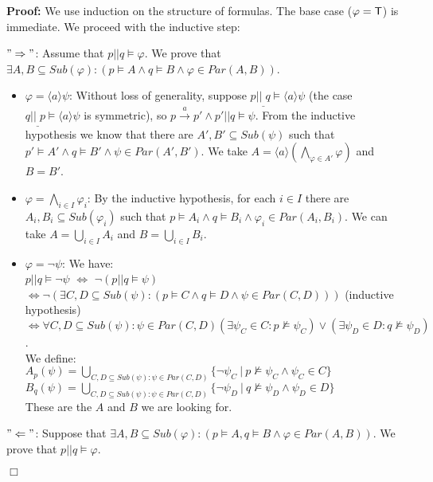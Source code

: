 \documentclass{eptcs}
\def\transa{\stackrel{a}{\rightarrow}}
\def\transa{\stackrel{a}{\rightarrow}}
\def\iff{\Leftrightarrow}
\def\implies{\Rightarrow}
\def\true{{\sf T}}
\newenvironment{proof}{\begin{trivlist} \item[\hspace{\labelsep}\bf Proof:]}{\hfill $\Box$ \end{trivlist}}
\newcommand{\diam}[1]{\langle#1\rangle}
\newcommand{\lmerge}[2]{#1 ||_{\_} #2}
\begin{document}
\begin{proof} 
 We use induction on the structure of formulas. The base case ($\varphi = \true$) is immediate. We proceed with the inductive step:
 
$"\implies"$: Assume that $p || q \models \varphi$. We prove that $\exists A,B \subseteq Sub(\varphi): (p \models A \wedge q \models B \wedge \varphi \in Par(A,B))$.

\begin{itemize}
\item $\varphi = \diam{a} \psi$: Without loss of generality, suppose $\lmerge{p}{q} \models \diam{a} \psi$ (the case $\lmerge{q}{p} \models \diam{a} \psi$ is symmetric), so $p \transa p' \wedge p' || q \models \psi$. From the inductive hypothesis we know that there are $A',B' \subseteq Sub(\psi)$ such that $p' \models A' \wedge q \models B' \wedge \psi \in Par(A',B')$. We take $A = \diam{a}(\bigwedge_{\varphi\in A'}\varphi)$ and $B =B'$.

\item $\varphi = \bigwedge_{i\in I} \varphi_i$: By the inductive hypothesis, for each $i\in I$ there are $A_i,B_i\subseteq Sub(\varphi_i)$ such that $p\models A_i \wedge q\models B_i \wedge \varphi_i\in Par(A_i,B_i)$. We can take $A = \bigcup_{i \in I} A_i$ and $B = \bigcup_{i \in I} B_i$.

\item $\varphi = \neg \psi$: We have:\\
$p ||q \models \neg \psi $ $\iff$ $ \neg (p ||q \models \psi)$\\
$\iff \neg (\exists C,D \subseteq Sub(\psi): (p \models C \wedge q \models D \wedge \psi \in Par(C,D)))$ (inductive hypothesis)\\
$\iff \forall C,D \subseteq Sub(\psi): \psi \in Par(C,D) 
(\exists \psi_C \in C: p \not \models \psi_C) \vee (\exists \psi_D \in D: q \not \models \psi_D)$.\\
We define:\\
$ A_p(\psi) = \bigcup_{C,D \subseteq Sub(\psi): \psi \in Par(C,D) } \{ \neg \psi_C ~|~ p \not \models \psi_C \wedge \psi_C \in C \} $\\
$ B_q(\psi) = \bigcup_{C,D \subseteq Sub(\psi): \psi \in Par(C,D) } \{ \neg \psi_D ~|~ q \not \models \psi_D \wedge \psi_D \in D \} $\\
These are the $A$ and $B$ we are looking for.
\end{itemize}

$"\Leftarrow"$: Suppose that $\exists A,B \subseteq Sub(\varphi): (p \models A, q \models B \wedge \varphi \in Par(A,B))$. We prove that $p||q \models \varphi$.
\begin{itemize}


\end{itemize}
\end{proof}
\end{document}
